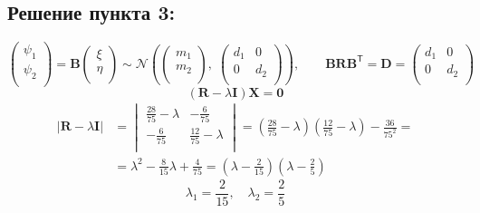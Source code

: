\documentclass[12pt]{spbstu-task}
\begin{document}
\subsection*{Решение пункта 3:}
\begin{displaymath}
  \begin{pmatrix}
    \psi_1 \\
    \psi_2 \\
  \end{pmatrix} = \mathbf{B}\begin{pmatrix}
    \xi \\
    \eta \\
  \end{pmatrix} \sim
  \mathcal{N}\left(\begin{pmatrix}
    m_1 \\ m_2 \\
  \end{pmatrix},\;\begin{pmatrix}
    d_1 & 0 \\
    0 & d_2 \\
  \end{pmatrix}\right),\qquad
  \mathbf{B}\mathbf{R}\mathbf{B}^\mathsf{T} = \mathbf{D} = \begin{pmatrix}
    d_1 & 0 \\
    0 & d_2 \\
  \end{pmatrix}
\end{displaymath}
\begin{displaymath}
  (\mathbf{R} - \lambda\mathbf{I})\mathbf{X} = \mathbf{0}
\end{displaymath}
\begin{align*}
  |\mathbf{R} - \lambda\mathbf{I}| &=
  \begin{vmatrix}
    \frac{28}{75} - \lambda & -\frac{6}{75} \\
    -\frac{6}{75} & \frac{12}{75} - \lambda \\
  \end{vmatrix} =
  \left(\frac{28}{75} - \lambda\right)\left(\frac{12}{75} - \lambda\right) - \frac{36}{75^2} = \\
  &= \lambda^2 - \frac{8}{15}\lambda + \frac{4}{75} =
  \left(\lambda - \frac{2}{15}\right)\left(\lambda - \frac{2}{5}\right)
\end{align*}
\begin{displaymath}
  \lambda_1 = \frac{2}{15},\quad\lambda_2 = \frac{2}{5}
\end{displaymath}
\end{document}
